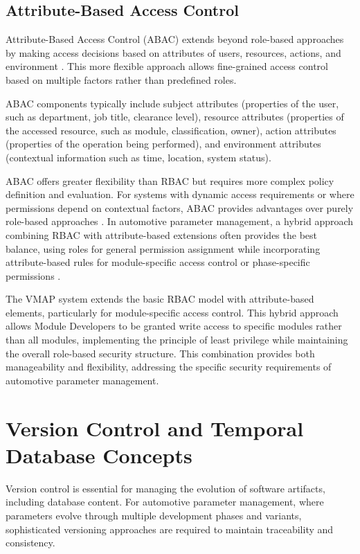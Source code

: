 \subsection{Attribute-Based Access Control}
\label{subsec:attribute-based-access-control}

Attribute-Based Access Control (ABAC) extends beyond role-based approaches by making access decisions based on attributes of users, resources, actions, and environment \cite{hu2015implementing}. This more flexible approach allows fine-grained access control based on multiple factors rather than predefined roles.

ABAC components typically include subject attributes (properties of the user, such as department, job title, clearance level), resource attributes (properties of the accessed resource, such as module, classification, owner), action attributes (properties of the operation being performed), and environment attributes (contextual information such as time, location, system status).

ABAC offers greater flexibility than RBAC but requires more complex policy definition and evaluation. For systems with dynamic access requirements or where permissions depend on contextual factors, ABAC provides advantages over purely role-based approaches \cite{xu2014specification}. In automotive parameter management, a hybrid approach combining RBAC with attribute-based extensions often provides the best balance, using roles for general permission assignment while incorporating attribute-based rules for module-specific access control or phase-specific permissions \cite{sandhu1997arbac97}.

The VMAP system extends the basic RBAC model with attribute-based elements, particularly for module-specific access control. This hybrid approach allows Module Developers to be granted write access to specific modules rather than all modules, implementing the principle of least privilege while maintaining the overall role-based security structure. This combination provides both manageability and flexibility, addressing the specific security requirements of automotive parameter management.

\section{Version Control and Temporal Database Concepts}
\label{sec:version-control-temporal-concepts}

Version control is essential for managing the evolution of software artifacts, including database content. For automotive parameter management, where parameters evolve through multiple development phases and variants, sophisticated versioning approaches are required to maintain traceability and consistency.

